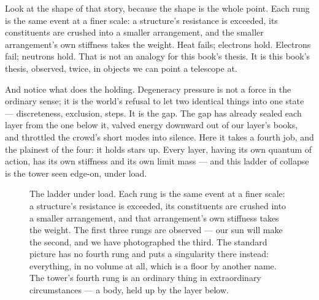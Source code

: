 Look at the shape of that story, because the shape is the whole point. Each rung is the same event at a finer scale: a structure's resistance is exceeded, its constituents are crushed into a smaller arrangement, and the smaller arrangement's own stiffness takes the weight. Heat fails; electrons hold. Electrons fail; neutrons hold. That is not an analogy for this book's thesis. It is this book's thesis, observed, twice, in objects we can point a telescope at.

And notice what does the holding. Degeneracy pressure is not a force in the ordinary sense; it is the world's refusal to let two identical things into one state --- discreteness, exclusion, steps. It is the gap. The gap has already sealed each layer from the one below it, valved energy downward out of our layer's books, and throttled the crowd's short modes into silence. Here it takes a fourth job, and the plainest of the four: it holds stars up. Every layer, having its own quantum of action, has its own stiffness and its own limit mass --- and this ladder of collapse is the tower seen edge-on, under load.

\begin{figure}[htbp]
\centering
{}
\caption{The ladder under load. Each rung is the same event at a finer scale: a structure's resistance is exceeded, its constituents are crushed into a smaller arrangement, and that arrangement's own stiffness takes the weight. The first three rungs are observed --- our sun will make the second, and we have photographed the third. The standard picture has no fourth rung and puts a singularity there instead: everything, in no volume at all, which is a floor by another name. The tower's fourth rung is an ordinary thing in extraordinary circumstances --- a body, held up by the layer below.}
\label{fig:collapseladder}
\end{figure}

